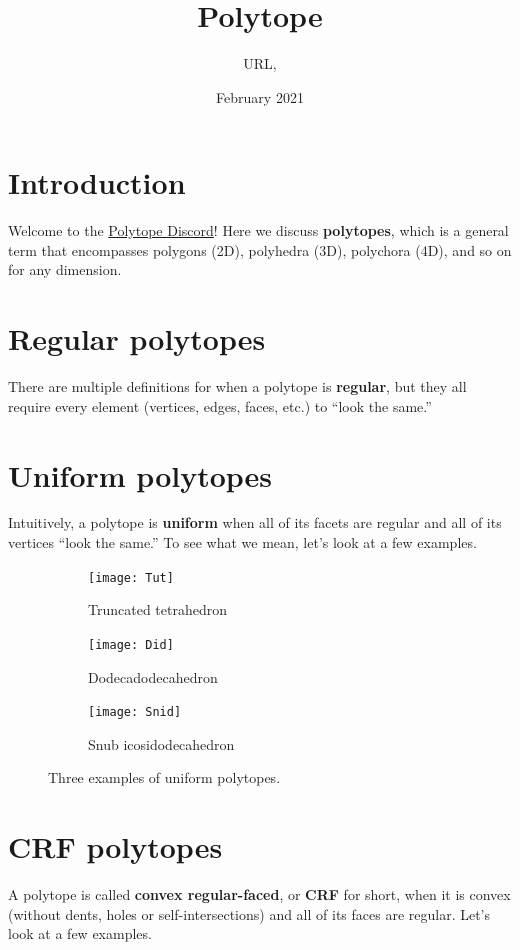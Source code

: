 \documentclass{article}
\title{Polytope}
\author{URL, }
\date{February 2021}
\begin{document}
\maketitle

\section{Introduction}
Welcome to the \href{https://discord.gg/invite/zMRu7T4}{Polytope Discord}! Here we discuss \textbf{polytopes}, which is a general term that encompasses polygons (2D), polyhedra (3D), polychora (4D), and so on for any dimension.

\section{Regular polytopes}
There are multiple definitions for when a polytope is \textbf{regular}, but they all require every element (vertices, edges, faces, etc.) to ``look the same.''

\section{Uniform polytopes}
Intuitively, a polytope is \textbf{uniform} when all of its facets are regular and all of its vertices ``look the same.'' To see what we mean, let's look at a few examples.

\begin{figure}[h]
\centering
\begin{subfigure}{.33333\textwidth}
  \centering
  \texttt{[image: Tut]}
  \caption{Truncated tetrahedron}
  \label{fig:tut}
\end{subfigure}%
\begin{subfigure}{.33333\textwidth}
  \centering
  \texttt{[image: Did]}
  \caption{Dodecadodecahedron}
  \label{fig:did}
\end{subfigure}%
\begin{subfigure}{.33333\textwidth}
  \centering
  \texttt{[image: Snid]}
  \caption{Snub icosidodecahedron}
  \label{fig:snid}
\end{subfigure}%
\caption{Three examples of uniform polytopes.}
\label{fig:polyhedra}
\end{figure}

\section{CRF polytopes}
A polytope is called \textbf{convex regular-faced}, or \textbf{CRF} for short, when it is convex (without dents, holes or self-intersections) and all of its faces are regular. Let's look at a few examples.
\end{document}

